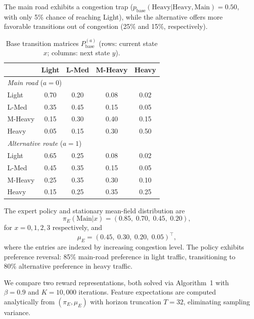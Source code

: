 \documentclass[11pt]{article}
\begin{document}
The main road exhibits a congestion trap ($p_{\text{base}}(\text{Heavy}|\text{Heavy},\text{Main}) = 0.50$, with only 5\% chance of reaching Light), while the alternative offers more favorable transitions out of congestion (25\% and 15\%, respectively).

\begin{table}[t]
\centering
\caption{Base transition matrices $P_{\text{base}}^{(a)}$ (rows: current state $x$; columns: next state $y$).}
\label{tab:transitions}
\begin{tabular}{lcccc}
\toprule
& Light & L-Med & M-Heavy & Heavy \\
\midrule
\multicolumn{5}{l}{\textit{Main road} ($a=0$)} \\
Light      & 0.70 & 0.20 & 0.08 & 0.02 \\
L-Med      & 0.35 & 0.45 & 0.15 & 0.05 \\
M-Heavy    & 0.15 & 0.30 & 0.40 & 0.15 \\
Heavy      & 0.05 & 0.15 & 0.30 & 0.50 \\
\midrule
\multicolumn{5}{l}{\textit{Alternative route} ($a=1$)} \\
Light      & 0.65 & 0.25 & 0.08 & 0.02 \\
L-Med      & 0.45 & 0.35 & 0.15 & 0.05 \\
M-Heavy    & 0.25 & 0.35 & 0.30 & 0.10 \\
Heavy      & 0.15 & 0.25 & 0.35 & 0.25 \\
\bottomrule
\end{tabular}
\end{table}

The expert policy and stationary mean-field distribution are
\begin{equation*}
\pi_E(\text{Main}|x) = (0.85,\; 0.70,\; 0.45,\; 0.20), \end{equation*} for $x = 0, 1, 2, 3$ respectively,
and
\begin{equation*}
\mu_E = (0.45,\; 0.30,\; 0.20,\; 0.05)^\top,
\end{equation*}
where the entries are indexed by increasing congestion level. The policy exhibits preference reversal: 85\% main-road preference in light traffic, transitioning to 80\% alternative preference in heavy traffic.

We compare two reward representations, both solved via Algorithm~1 with $\beta = 0.9$ and $K = 10{,}000$ iterations.
Feature expectations are computed analytically from $(\pi_E, \mu_E)$ with horizon truncation $T = 32$, eliminating sampling variance.
\end{document}
